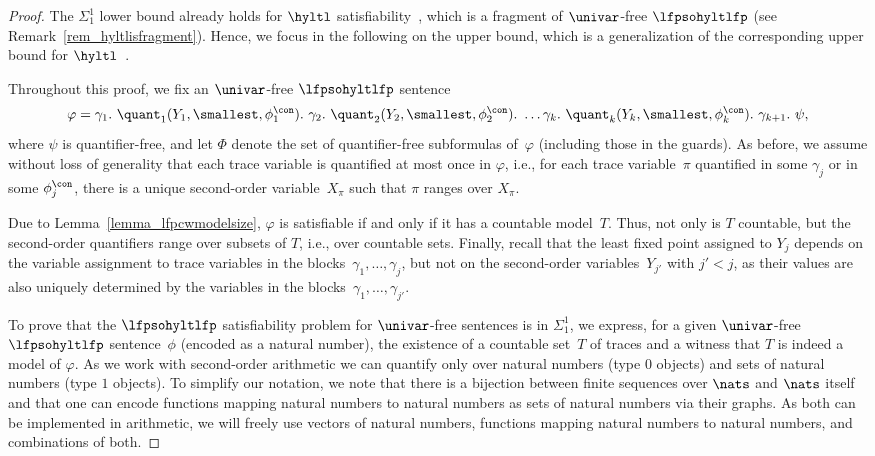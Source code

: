 \begin{proof}
The $\Sigma_1^1$ lower bound already holds for $\hyltl$ satisfiability~\cite{hyperltlsatconf}, which is a fragment of $\univar$-free $\lfpsohyltlfp$ (see Remark~\ref{rem_hyltlisfragment}). 
Hence, we focus in the following on the upper bound, which is a generalization of the corresponding upper bound for $\hyltl$~\cite{hyperltlsatconf}.

Throughout this proof, we fix an $\univar$-free $\lfpsohyltlfp$ sentence
\[
\varphi =
\gamma_1.\ \quant_1 (Y_1, \smallest, \phi_1^\con).\ 
\gamma_2.\ \quant_2(Y_2, \smallest, \phi_2^\con).\ 
\ldots 
\gamma_k.\ \quant_k(Y_k, \smallest, \phi_k^\con).\
\gamma_{k+1}.\
\psi
,\] where $\psi$ is quantifier-free, and let $\Phi$ denote the set of quantifier-free subformulas of~$\varphi$ (including those in the guards). As before, we assume without loss of generality that each trace variable is quantified at most once in $\varphi$, i.e., for each trace variable~$\pi$ quantified in some $\gamma_j$ or in some $\phi_j^\con$, there is a unique second-order variable~$X_\pi$ such that $\pi$ ranges over $X_\pi$.

Due to Lemma~\ref{lemma_lfpcwmodelsize}, $\varphi$ is satisfiable if and only if it has a countable model~$T$. Thus, not only is $T$ countable, but the second-order quantifiers range over subsets of $T$, i.e., over countable sets. 
Finally, recall that the least fixed point assigned to $Y_j$ depends on the variable assignment to trace variables in the blocks~$\gamma_1,\ldots, \gamma_j$, but not on the second-order variables~$Y_{j'}$ with $j' < j$, as their values are also uniquely determined by the variables in the blocks~$\gamma_1,\ldots, \gamma_{j'}$.


To prove that the $\lfpsohyltlfp$ satisfiability problem for $\univar$-free sentences is in $\Sigma_1^1$, we express, for a given $\univar$-free $\lfpsohyltlfp$ sentence~$\phi$ (encoded as a natural number), the existence of a countable set~$T$ of traces and a witness that $T$ is indeed a model of $\varphi$.
As we work with second-order arithmetic we can quantify only over natural numbers (type $0$ objects) and sets of natural numbers (type $1$ objects). To simplify our notation, we note that there is a bijection between finite sequences over $\nats$ and $\nats$ itself and that one can encode functions mapping natural numbers to natural numbers as sets of natural numbers via their graphs. As both can be implemented in arithmetic, we will freely use vectors of natural numbers, functions mapping natural numbers to natural numbers, and combinations of both. 


\end{proof}
